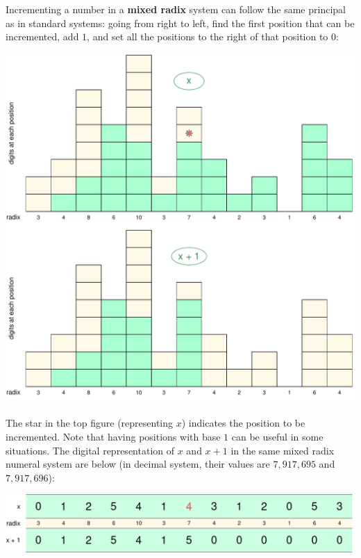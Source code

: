 \documentclass[12pt]{article}
\begin{document}
Incrementing a number in a \textbf{mixed radix} system can follow the same principal as in standard systems: going from right to left, find the first position that can be incremented, add $1$, and set all the positions to the right of that position to $0$: 
\begin{center}
  \includegraphics[scale = 0.52]{incr2.pdf} 
\end{center}

The star in the top figure (representing $x$) indicates the position to be incremented. Note that having positions with base $1$ can be useful in some situations. The digital representation of $x$ and $x + 1$ in the same mixed radix numeral system are below (in decimal system, their values are $7,917,695$ and $7,917,696$): 
\begin{center}
  \includegraphics[scale = 0.52]{incr3b.pdf}
\end{center}
\vspace{2mm} 
\end{document}
